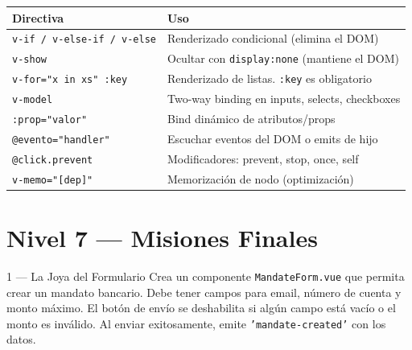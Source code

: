 \documentclass[11pt,a4paper]{article}
\begin{document}
\begin{center}
\begin{tabular}{p{3.5cm} p{9cm}}
\toprule
\textbf{Directiva} & \textbf{Uso} \\
\midrule
\texttt{v-if / v-else-if / v-else}
  & Renderizado condicional (elimina el DOM) \\
\texttt{v-show}
  & Ocultar con \texttt{display:none} (mantiene el DOM) \\
\texttt{v-for="x in xs" :key}
  & Renderizado de listas. \texttt{:key} es obligatorio \\
\texttt{v-model}
  & Two-way binding en inputs, selects, checkboxes \\
\texttt{:prop="valor"}
  & Bind dinámico de atributos/props \\
\texttt{@evento="handler"}
  & Escuchar eventos del DOM o emits de hijo \\
\texttt{@click.prevent}
  & Modificadores: prevent, stop, once, self \\
\texttt{v-memo="[dep]"}
  & Memorización de nodo (optimización) \\
\bottomrule
\end{tabular}
\end{center}

\section{Nivel 7 — Misiones Finales}

\begin{mision}{1 — La Joya del Formulario}
Crea un componente \texttt{MandateForm.vue} que permita crear un mandato
bancario. Debe tener campos para email, número de cuenta y monto máximo.
El botón de envío se deshabilita si algún campo está vacío o el monto
es inválido. Al enviar exitosamente, emite \texttt{'mandate-created'} con
los datos.
\end{mision}
\end{document}
